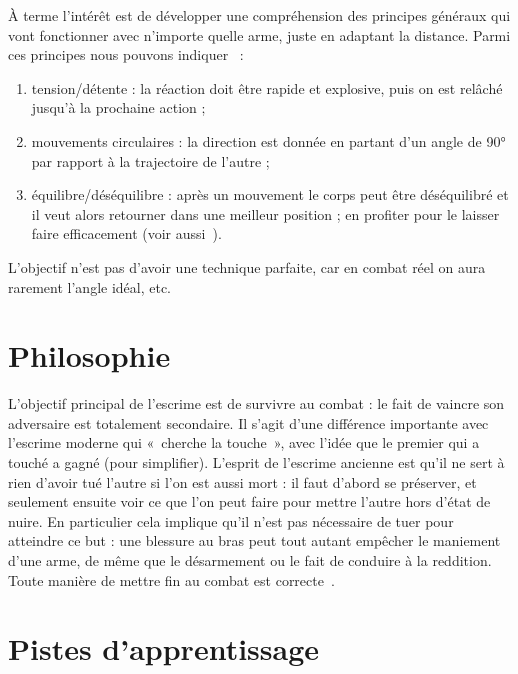 À terme l'intérêt est de développer une compréhension des principes généraux qui vont fonctionner avec n'importe quelle arme, juste en adaptant la distance.
Parmi ces principes nous pouvons indiquer~\cite{enzi:dijon:messer_inner:2015} :
\begin{enumerate}
	\item tension/détente : la réaction doit être rapide et explosive, puis on est relâché jusqu'à la prochaine action ;
	\item mouvements circulaires : la direction est donnée en partant d'un angle de \ang{90} par rapport à la trajectoire de l'autre ;
	\item équilibre/déséquilibre : après un mouvement le corps peut être déséquilibré et il veut alors retourner dans une meilleur position ; en profiter pour le laisser faire efficacement (voir aussi~\cite{guidoux:dijon:thibault:2015}).
\end{enumerate}
L'objectif n'est pas d'avoir une technique parfaite, car en combat réel on aura rarement l'angle idéal, etc.


\section{Philosophie}


L'objectif principal de l'escrime est de survivre au combat : le fait de vaincre son adversaire est totalement secondaire.
Il s'agit d'une différence importante avec l'escrime moderne qui « cherche la touche », avec l'idée que le premier qui a touché a gagné (pour simplifier).
L'esprit de l'escrime ancienne est qu'il ne sert à rien d'avoir tué l'autre si l'on est aussi mort : il faut d'abord se préserver, et seulement ensuite voir ce que l'on peut faire pour mettre l'autre hors d'état de nuire.
En particulier cela implique qu'il n'est pas nécessaire de tuer pour atteindre ce but : une blessure au bras peut tout autant empêcher le maniement d'une arme, de même que le désarmement ou le fait de conduire à la reddition.
Toute manière de mettre fin au combat est correcte~\footnotemark{}.


\section{Pistes d'apprentissage}


